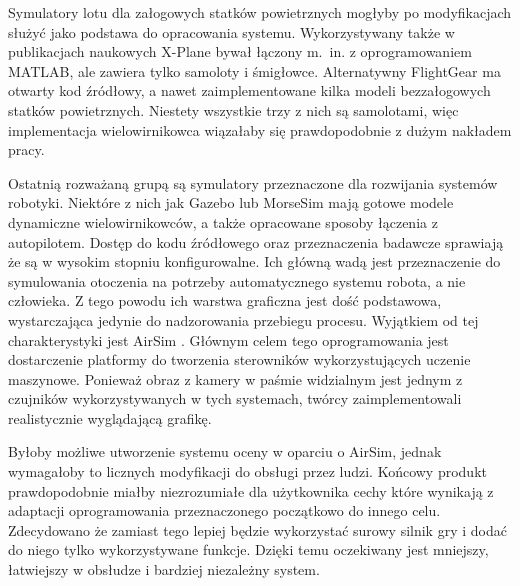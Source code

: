 Symulatory lotu dla załogowych statków powietrznych mogłyby po modyfikacjach służyć jako podstawa do opracowania systemu. Wykorzystywany także w publikacjach naukowych X-Plane \cite{xplane} bywał łączony m.~in. z oprogramowaniem MATLAB, ale zawiera tylko samoloty i śmigłowce. Alternatywny FlightGear \cite{flightgear} ma otwarty kod źródłowy, a nawet zaimplementowane kilka modeli bezzałogowych statków powietrznych. Niestety wszystkie trzy z nich są samolotami, więc implementacja wielowirnikowca wiązałaby się prawdopodobnie z dużym nakładem pracy.

Ostatnią rozważaną grupą są symulatory przeznaczone dla rozwijania systemów robotyki. Niektóre z nich jak Gazebo \cite{gazebo} lub MorseSim mają gotowe modele dynamiczne wielowirnikowców, a także opracowane sposoby łączenia z autopilotem. Dostęp do kodu źródłowego oraz przeznaczenia badawcze sprawiają że są w wysokim stopniu konfigurowalne. Ich główną wadą jest przeznaczenie do symulowania otoczenia na potrzeby automatycznego systemu robota, a nie człowieka. Z tego powodu ich warstwa graficzna jest dość podstawowa, wystarczająca jedynie do nadzorowania przebiegu procesu. Wyjątkiem od tej charakterystyki jest AirSim \cite{airsim2017}. Głównym celem tego oprogramowania jest dostarczenie platformy do tworzenia sterowników wykorzystujących uczenie maszynowe. Ponieważ obraz z kamery w paśmie widzialnym jest jednym z czujników wykorzystywanych w tych systemach, twórcy zaimplementowali realistycznie wyglądającą grafikę.

Byłoby możliwe utworzenie systemu oceny w oparciu o AirSim, jednak wymagałoby to licznych modyfikacji do obsługi przez ludzi. Końcowy produkt prawdopodobnie miałby niezrozumiałe dla użytkownika cechy które wynikają z adaptacji oprogramowania przeznaczonego początkowo do innego celu. Zdecydowano że zamiast tego lepiej będzie wykorzystać surowy silnik gry i dodać do niego tylko wykorzystywane funkcje. Dzięki temu oczekiwany jest mniejszy, łatwiejszy w obsłudze i bardziej niezależny system.
